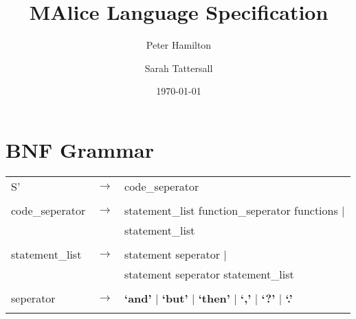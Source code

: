\documentclass[landscape]{article}
\begin{document}
  \title{MAlice Language Specification}

  \author{Peter Hamilton \and Sarah Tattersall}

  \date{\today}         %

  \maketitle            %

  \section{BNF Grammar}

  \begin{longtable}{ l c l}

    \\

    S' & \ensuremath{\to} &  code\_seperator  \\

    \\

    code\_seperator & \ensuremath{\to} &  statement\_list  function\_seperator  functions   | \\
    & &  statement\_list  \\

    \\

    statement\_list & \ensuremath{\to} &  statement  seperator |\\
    & &  statement  seperator  statement\_list \\

    \\

    seperator & \ensuremath{\to} &  \textbf{`and'}  | \textbf{`but'}  | \textbf{`then'}  | \textbf{`,'}  | \textbf{`?'}  | \textbf{`.'} \\

    \\


\end{longtable}
\end{document}

